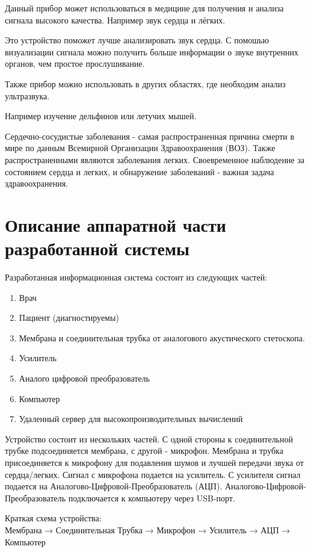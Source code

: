 Данный прибор может использоваться в медицине для получения и анализа сигнала высокого качества. Например звук сердца и лёгких. 

Это устройство поможет лучше анализировать звук сердца. С помошью визуализации сигнала можно получить больше информации о звуке внутренних органов, чем простое прослушивание.

Также прибор можно использовать в других областях, где необходим анализ ультразвука. 

Например изучение дельфинов или летучих мышей. 

Сердечно-сосудистые заболевания - самая распространенная причина смерти в мире по данным Всемирной Организации Здравоохранения (ВОЗ). Также распространенными являются заболевания легких. Своевременное наблюдение за состоянием сердца и легких, и обнаружение заболеваний - важная задача здравоохранения.

\newpage  
\section{Описание аппаратной части разработанной системы}
Разработанная информационная система состоит из следующих частей:
\begin{enumerate}
  \item Врач
  \item Пациент (диагностируемы)
  \item Мембрана и соединительная трубка от аналогового акустического стетоскопа.
  \item Усилитель
  \item Аналого цифровой преобразователь
  \item Компьютер
  \item Удаленный сервер для высокопроизводительных вычислений
\end{enumerate}

Устройство состоит из нескольких частей. С одной стороны к соединительной трубке подсоединяется мембрана, с другой - микрофон. Мембрана и трубка присоединяется к микрофону для подавления шумов и лучшей передачи звука от сердца/легких. Сигнал с микрофона подается на усилитель. С усилителя сигнал подается на Аналогово-Цифровой-Преобразователь (АЦП). Аналогово-Цифровой-Преобразователь подключается к компьютеру через USB-порт.

\begin{center}
Краткая схема устройства:\\
\noindent\small{{Мембрана → Соединительная Трубка → Микрофон → Усилитель → АЦП → Компьютер}}
\end{center}

